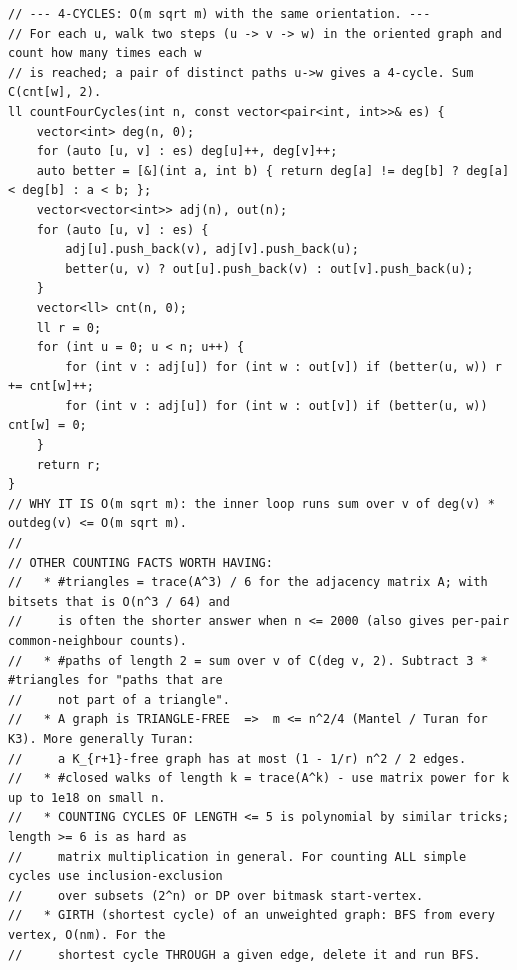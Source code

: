\documentclass[9pt,a4paper,twocolumn]{extarticle}
\begin{document}
\begin{lstlisting}
// --- 4-CYCLES: O(m sqrt m) with the same orientation. ---
// For each u, walk two steps (u -> v -> w) in the oriented graph and count how many times each w
// is reached; a pair of distinct paths u->w gives a 4-cycle. Sum C(cnt[w], 2).
ll countFourCycles(int n, const vector<pair<int, int>>& es) {
    vector<int> deg(n, 0);
    for (auto [u, v] : es) deg[u]++, deg[v]++;
    auto better = [&](int a, int b) { return deg[a] != deg[b] ? deg[a] < deg[b] : a < b; };
    vector<vector<int>> adj(n), out(n);
    for (auto [u, v] : es) {
        adj[u].push_back(v), adj[v].push_back(u);
        better(u, v) ? out[u].push_back(v) : out[v].push_back(u);
    }
    vector<ll> cnt(n, 0);
    ll r = 0;
    for (int u = 0; u < n; u++) {
        for (int v : adj[u]) for (int w : out[v]) if (better(u, w)) r += cnt[w]++;
        for (int v : adj[u]) for (int w : out[v]) if (better(u, w)) cnt[w] = 0;
    }
    return r;
}
// WHY IT IS O(m sqrt m): the inner loop runs sum over v of deg(v) * outdeg(v) <= O(m sqrt m).
//
// OTHER COUNTING FACTS WORTH HAVING:
//   * #triangles = trace(A^3) / 6 for the adjacency matrix A; with bitsets that is O(n^3 / 64) and
//     is often the shorter answer when n <= 2000 (also gives per-pair common-neighbour counts).
//   * #paths of length 2 = sum over v of C(deg v, 2). Subtract 3 * #triangles for "paths that are
//     not part of a triangle".
//   * A graph is TRIANGLE-FREE  =>  m <= n^2/4 (Mantel / Turan for K3). More generally Turan:
//     a K_{r+1}-free graph has at most (1 - 1/r) n^2 / 2 edges.
//   * #closed walks of length k = trace(A^k) - use matrix power for k up to 1e18 on small n.
//   * COUNTING CYCLES OF LENGTH <= 5 is polynomial by similar tricks; length >= 6 is as hard as
//     matrix multiplication in general. For counting ALL simple cycles use inclusion-exclusion
//     over subsets (2^n) or DP over bitmask start-vertex.
//   * GIRTH (shortest cycle) of an unweighted graph: BFS from every vertex, O(nm). For the
//     shortest cycle THROUGH a given edge, delete it and run BFS.
\end{lstlisting}

\filbreak
\end{document}
